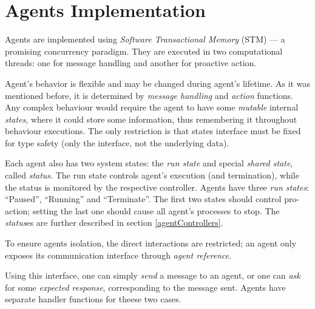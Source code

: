 \section{Agents Implementation}

Agents are implemented using \emph{Software Transactional Memory} (STM)
\cite{STMCode07} --- a promising concurrency paradigm.
They are executed in two computational threads:
one for message handling and another for proactive action.

\medskip

\noindent
Agent's behavior is flexible and may be changed during agent's lifetime.
As it was mentioned before, it is determined by \emph{message handling} and
\emph{action} functions.
Any complex behaviour would require the agent to have some \emph{mutable}
internal \emph{states}, where it could store some information,
thus remembering it throughout behaviour executions.
The only restriction is that states interface must be fixed for type safety
(only the interface, not the underlying data).


Each agent also has two system states: the \emph{run state} and special \emph{shared
  state}, called \emph{status}. The run state controls agent's execution
(and termination), while the status is monitored by the respective controller.
Agents have three \emph{run states}: ``Paused'', ``Running'' and ``Terminate''.
The first two states should control pro-action;
setting the last one should cause all agent's processes to stop.
The \emph{status}es are further described in section \ref{agentControllers}.

\medskip

To ensure agents isolation, the direct interactions are restricted;
an agent only exposes its communication interface through \emph{agent reference}.

Using this interface, one can simply \emph{send} a message to an agent,
or one can \emph{ask} for some \emph{expected response}, corresponding to the message sent.
Agents have separate handler functions for theese two cases.



